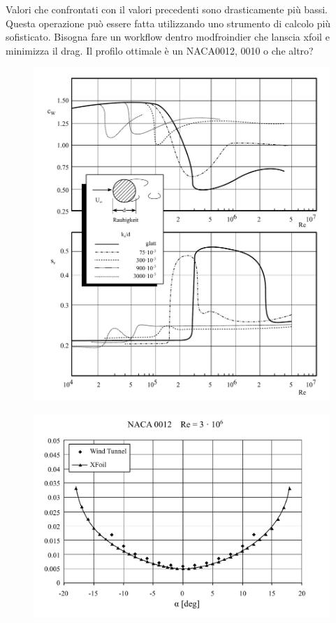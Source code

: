 \documentclass[fleqn]{article}
\begin{document}
Valori che confrontati con il valori precedenti sono drasticamente più bassi. 
Questa operazione può essere fatta utilizzando uno strumento di calcolo più sofisticato. Bisogna fare un workflow dentro modfroindier che lanscia xfoil e minimizza il drag. Il profilo ottimale è un NACA0012, 0010 o che altro?
\begin{figure}
\centering
  \includegraphics[width=\textwidth]{fig/coefficienteW.pdf}
\caption{}
\label{fig:cW}
\end{figure} 
\begin{figure}
\centering
  \includegraphics[width=\textwidth]{fig/DragCoeffXFOIL.pdf}
\caption{}
\label{fig:cW}
\end{figure} 
\end{document}
